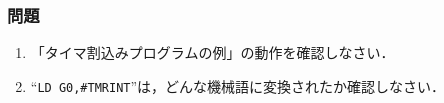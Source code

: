 \subsubsection{問題}
\begin{enumerate}
\item 「タイマ割込みプログラムの例」の動作を確認しなさい．
\item ``{\tt LD G0,\#TMRINT}''は，どんな機械語に変換されたか確認しなさい．
\end{enumerate}

%


